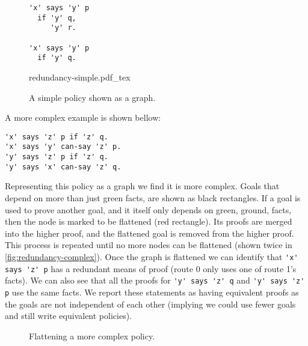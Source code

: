 \documentclass[a4paper]{scrartcl}
\begin{document}
\begin{figure}
  \centering
  \begin{minipage}{0.4\linewidth}
    \begin{lstlisting}
'x' says 'y' p
  if 'y' q,
     'y' r.

'x' says 'y' p
  if 'y' q.
    \end{lstlisting}
  \end{minipage}
  \begin{minipage}{0.59\linewidth}
    \scriptsize{}
    \def\svgwidth{\columnwidth}
    {redundancy-simple.pdf_tex}
  \end{minipage}
  \caption{A simple policy shown as a graph.}
  \label{fig:redundancy-graph-simple}
\end{figure}

A more complex example is shown bellow:
\begin{lstlisting}
'x' says 'z' p if 'z' q.
'x' says 'y' can-say 'z' p.
'y' says 'z' p if 'z' q.
'y' says 'x' can-say 'z' q.
\end{lstlisting}
Representing this policy as a graph we find it is more complex. Goals that
depend on more than just green facts, are shown as black rectangles.  If a goal
is used to prove another goal, and it itself only depends on green, ground,
facts, then the node is marked to be flattened (red rectangle).  Its proofs are
merged into the higher proof, and the flattened goal is removed from the higher
proof.  This process is repeated until no more nodes can be flattened (shown
twice in \autoref{fig:redundancy-complex}).  Once the graph is flattened we can
identify that \lstinline!'x' says 'z' p! has a redundant means of proof (route
0 only uses one of route 1's facts).  We can also see that all the proofs for
\lstinline!'y' says 'z' q! and \lstinline!'y' says 'z' p! use the same facts.
We report these statements as having equivalent proofs as the goals are not
independent of each other (implying we could use fewer goals and still write
equivalent policies).
\begin{figure}
  \centering\tiny
  \caption{Flattening a more complex policy.}
  \label{fig:redundancy-complex}
\end{figure}
\end{document}
